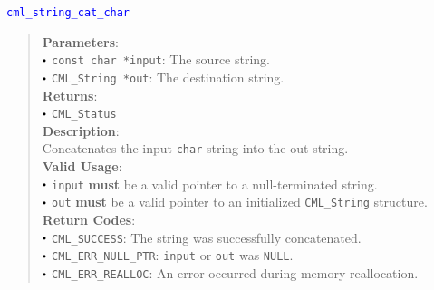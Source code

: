 \documentclass[a4paper,oneside,10pt]{article}
\newcommand{\function}[1]{
  \noindent\textcolor{blue}{\texttt{#1}}
  \vspace{-0.3em}
}
\renewcommand{\dot}{\raisebox{0.3ex}{\scalebox{0.6}{$\bullet$}}}
\theoremstyle{definition}
\begin{document}
\function{cml\_string\_cat\_char}
\begin{quote}
  \textbf{Parameters}: \\
  $\dot$ \texttt{const char *input}: The source string. \\
  $\dot$ \texttt{CML\_String *out}: The destination string. \\
  \textbf{Returns}: \\
  $\dot$ \texttt{CML\_Status} \\

  \vspace{-0.75em}
  \textbf{Description}: \\
  Concatenates the input \texttt{char} string into the out string. \\

  \vspace{-0.75em}
  \textbf{Valid Usage}: \\
  $\dot$ \texttt{input} \textbf{must} be a valid pointer to a null-terminated string. \\
  $\dot$ \texttt{out} \textbf{must} be a valid pointer to an initialized \texttt{CML\_String} structure. \\

  \vspace{-0.75em}
  \textbf{Return Codes}: \\
  $\dot$ \texttt{CML\_SUCCESS}: The string was successfully concatenated. \\
  $\dot$ \texttt{CML\_ERR\_NULL\_PTR}: \texttt{input} or \texttt{out} was \texttt{NULL}. \\
  $\dot$ \texttt{CML\_ERR\_REALLOC}: An error occurred during memory reallocation. \\
\end{quote}
\end{document}
